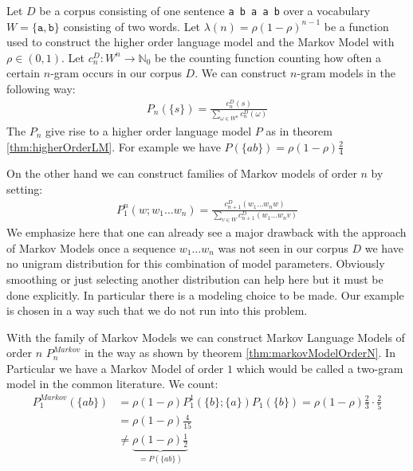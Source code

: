 \documentclass[•]{book}
\begin{document}
\begin{example}
Let $D$ be a corpus consisting of one sentence \texttt{a b a a b} over a vocabulary $W=\{\texttt{a},\texttt{b}\}$ consisting of two words.
Let $\lambda(n)=\rho(1-\rho)^{n-1}$ be a function used to construct the higher order language model and the Markov Model with $\rho \in (0,1)$. 
Let $c_n^D:W^n\longrightarrow \mathbb{N}_0$ be the counting function counting how often a certain $n$-gram occurs in our corpus $D$.
We can construct $n$-gram models in the following way:
\begin{align}
P_n(\{s\})=\frac{c_n^D(s)}{\sum_{\omega\in W^n}c_n^D(\omega)}
\end{align}
The $P_n$ give rise to a higher order language model $P$ as in theorem \ref{thm:higherOrderLM}.
For example we have $P(\{ab\})= \rho(1-\rho)\frac{2}{4}$ 

On the other hand we can construct families of Markov models of order $n$ by setting:
\begin{align}
P_1^n(w;w_1\dots w_n) = \frac{c_{n+1}^D(w_1\dots w_nw)}{\sum_{v\in W}c_{n+1}^D(w_1\dots w_nv)}
\end{align}
We emphasize here that one can already see a major drawback with the approach of Markov Models once a sequence $w_1\dots w_n$ was not seen in our corpus $D$ we have no unigram distribution for this combination of model parameters. 
Obviously smoothing or just selecting another distribution can help here but it must be done explicitly.
In particular there is a modeling choice to be made. 
Our example is chosen in a way such that we do not run into this problem. 

With the family of Markov Models we can construct Markov Language Models of order $n$ $P_n^{Markov}$ in the way as shown by theorem \ref{thm:markovModelOrderN}. 
In Particular we have a Markov Model of order $1$ which would be called a two-gram model in the common literature. 
We count:
\begin{align}
P_1^{Markov}(\{ab\}) & = \rho(1-\rho) P_1^1(\{b\};\{a\})P_1(\{b\}) = \rho(1-\rho) \frac{2}{3}\cdot\frac{2}{5} \\
 & = \rho(1-\rho)\frac{4}{15} \\
 & \neq  \underbrace{\rho(1-\rho) \frac{1}{2}}_{= P(\{ab\})}
\end{align}
\end{example}
\end{document}
